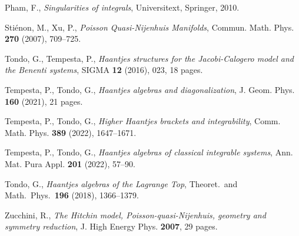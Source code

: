 \documentclass[12pt]{article}
\begin{document}

 Pham, F., {\it Singularities of integrals}, Universitext, Springer, 2010.

 Sti\'enon, M., Xu, P., {\it Poisson Quasi-Nijenhuis Manifolds}, Commun. Math. Phys. {\bf 270} (2007), 709--725.

 Tondo, G., Tempesta, P., {\it Haantjes structures for the Jacobi-Calogero model and the Benenti systems}, SIGMA {\bf 12} (2016), 023, 18 pages.

 Tempesta, P., Tondo, G., {\it Haantjes algebras and diagonalization}, J. Geom. Phys. {\bf 160} (2021), %
21 pages.

 Tempesta, P., Tondo, G., {\it Higher Haantjes brackets and integrability}, Comm. Math. Phys. {\bf 389} %
(2022), 1647--1671.

 Tempesta, P., Tondo, G., {\it Haantjes algebras of classical integrable systems},
Ann. Mat. Pura Appl. {\bf 201} %
(2022), 57--90.

 Tondo, G., {\it Haantjes algebras of the Lagrange Top}, 
Theoret.\ and Math.\ Phys.\ {\bf 196} %
(2018), 1366--1379.



%

 Zucchini, R., {\it The Hitchin model, Poisson-quasi-Nijenhuis, geometry and symmetry reduction}, 
J. High Energy Phys. {\bf 2007}, %
29 pages.
\end{document}
